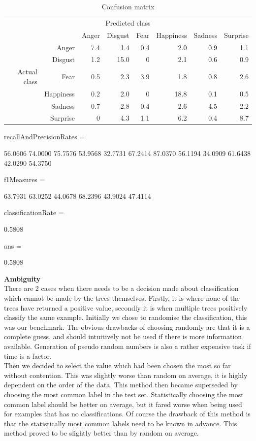 \documentclass[12pt]{article}
\begin{document}
\begin{table}
\centering
\begin{tabular}{r r | r r r r r r}
\multicolumn{8}{c}{Predicted class} \\
&  & Anger & Disgust & Fear & Happiness & Sadness & Surprise \\
\hline
& Anger & 7.4 & 1.4  & 0.4 & 2.0  & 0.9 & 1.1 \\
 & Disgust & 1.2 & 15.0 & 0   & 2.1  & 0.6 & 0.9 \\
Actual class & Fear & 0.5 & 2.3  & 3.9 & 1.8  & 0.8 & 2.6 \\
 & Happiness & 0.2 & 2.0  & 0   & 18.8 & 0.1 & 0.5 \\
& Sadness & 0.7 & 2.8  & 0.4 & 2.6  & 4.5 & 2.2 \\
& Surprise & 0   & 4.3  & 1.1 & 6.2  & 0.4 & 8.7 \\
\end{tabular}
\caption{Confusion matrix}
\end{table}


          recallAndPrecisionRates =

          56.0606   74.0000
          75.7576   53.9568
          32.7731   67.2414
          87.0370   56.1194
          34.0909   61.6438
          42.0290   54.3750


          f1Measures =

          63.7931
          63.0252
          44.0678
          68.2396
          43.9024
          47.4114


          classificationRate =

          0.5808


          ans =

          0.5808

{\bf Ambiguity} \\
There are 2 cases when there needs to be a decision made about classification which cannot be made by the trees themselves. Firstly, it is where none of the trees have returned a positive value, secondly it is when multiple trees positively classify the same example. Initially we chose to randomise the classification, this was our benchmark. The obvious drawbacks of choosing randomly are that it is a complete guess, and should intuitively not be used if there is more information available. Generation of pseudo random numbers is also a rather expensive task if time is a factor. \\

Then we decided to select the value which had been chosen the most so far without contention. This was slightly worse than random on average, it is highly dependent on the order of the data. This method then became superseded by choosing the most common label in the test set. Statistically choosing the most common label should be better on average, but it fared worse when being used for examples that has no classifications. Of course the drawback of this method is that the statistically most common labels need to be known in advance. This method proved to be slightly better than by random on average. \\
\end{document}
